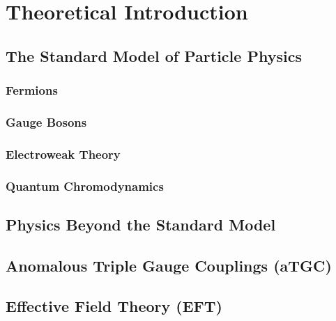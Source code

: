 \chapter{Theoretical Introduction}
\label{chap::TheoreticalIntroduction}

\section{The Standard Model of Particle Physics}
\subsection{Fermions}
\subsection{Gauge Bosons}
\subsection{Electroweak Theory}
\subsection{Quantum Chromodynamics}
\section{Physics Beyond the Standard Model}
\section{Anomalous Triple Gauge Couplings (aTGC)}
\section{Effective Field Theory (EFT)}